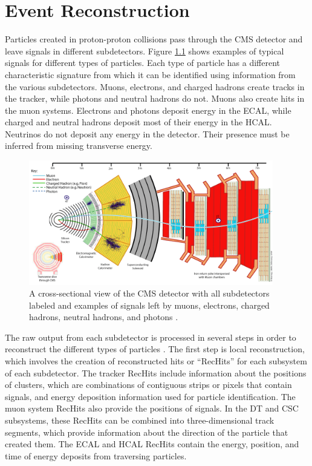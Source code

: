 \documentclass[12pt]{thesis}  %
\begin{document}
\chapter{Event Reconstruction
\label{ch:reconstruction}}

Particles created in proton-proton collisions pass through the CMS detector and leave signals in different subdetectors. Figure \ref{fig:cms-slice} shows examples of typical signals for different types of particles. Each type of particle has a different characteristic signature from which it can be identified using information from the various subdetectors. Muons, electrons, and charged hadrons create tracks in the tracker, while photons and neutral hadrons do not. Muons also create hits in the muon systems. Electrons and photons deposit energy in the ECAL, while charged and neutral hadrons deposit most of their energy in the HCAL. Neutrinos do not deposit any energy in the detector. Their presence must be inferred from missing transverse energy.

\begin{figure}[hbt]
\begin{center}
\includegraphics[width=0.95\textwidth]{figures/CMS_slice.png}
\caption{A cross-sectional view of the CMS detector with all subdetectors labeled and examples of signals left by muons, electrons, charged hadrons, neutral hadrons, and photons \cite{CMS-slice}.}
\label{fig:cms-slice}
\end{center}
\end{figure}

The raw output from each subdetector is processed in several steps in order to reconstruct the different types of particles \cite{TDR-software}. The first step is local reconstruction, which involves the creation of reconstructed hits or ``RecHits'' for each subsystem of each subdetector. The tracker RecHits include information about the positions of clusters, which are combinations of contiguous strips or pixels that contain signals, and energy deposition information used for particle identification. The muon system RecHits also provide the positions of signals. In the DT and CSC subsystems, these RecHits can be combined into three-dimensional track segments, which provide information about the direction of the particle that created them. The ECAL and HCAL RecHits contain the energy, position, and time of energy deposits from traversing particles.
\end{document}
